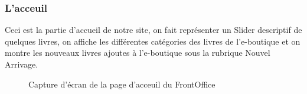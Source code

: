 \subsubsection{L'acceuil}
Ceci est la partie d'accueil de notre site, on fait représenter un Slider descriptif de quelques livres, on affiche les différentes catégories des livres de l'e-boutique et on montre les nouveaux livres ajoutes à l'e-boutique sous la rubrique Nouvel Arrivage.
\begin{figure}[H]
    \centering
    \caption{Capture d'écran de la page d'acceuil du FrontOffice}
\end{figure}
\newpage
